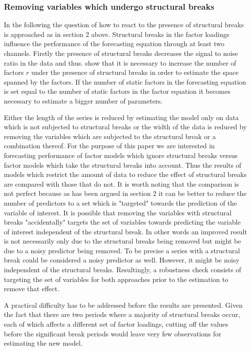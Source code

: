 \documentclass[12pt]{article}
\begin{document}
\subsubsection{Removing variables which undergo structural breaks}

In the following the question of how to react to the presence of structural breaks is approached as in section 2 above. Structural breaks in the factor loadings influence the performance of the forecasting equation through at least two channels. Firstly the presence of structural breaks decreases the signal to noise ratio in the data and thus. \citet{breitung2011testing} show that it is necessary to increase the number of factors $r$ under the presence of structural breaks in order to estimate the space spanned by the factors. If the number of static factors in the forecasting equation is set equal to the number of static factors in the factor equation it becomes necessary to estimate a bigger number of parameters. 


Either the length of the series is reduced by estimating the model only on data which is not subjected to structural breaks or the width of the data is reduced by removing the variables which are subjected to the structural break or a combination thereof. For the purpose of this paper we are interested in forecasting performance of factor models which ignore structural breaks versus factor models which take the structural breaks into account. Thus the results of models which restrict the amount of data to reduce the effect of structural breaks are compared with those that do not. It is worth noting that the comparison is not perfect because as has been argued in section $2$ it can be better to reduce the number of predictors to a set which is "targeted" towards the prediction of the variable of interest. It is possible that removing the variables with structural breaks "accidentally" targets the set of variables towards predicting the variable of interest independent of the structural break. In other words an improved result is not necessarily only due to the structural breaks being removed but might be due to a noisy predictor being removed. To be precise a series with a structural break could be considered a noisy predictor as well. However, it might be noisy independent of the structural breaks.
Resultingly, a robustness check consists of targeting the set of variables for both approaches prior to the estimation to remove that effect.

A practical difficulty has to be addressed before the results are presented. Given the fact that there are two periods where a majority of structural breaks occur, each of which affects a different set of factor loadings, cutting off the values before the significant break periods would leave very few observations for estimating the new model.
\end{document}
